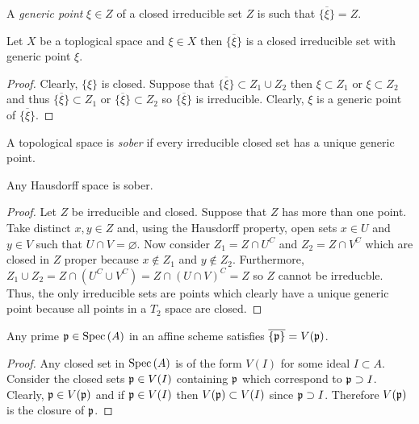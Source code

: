 \documentclass[12pt]{article}
\begin{document}
\begin{definition}
A \textit{generic point} $\xi \in Z$ of a closed irreducible set $Z$ is such that $\overline{\{ \xi \} } = Z$. 
\end{definition}

\begin{proposition}
Let $X$ be a toplogical space and $\xi \in X$ then $\overline{\{ \xi \} }$ is a closed irreducible set with generic point $\xi$. 
\end{proposition}

\begin{proof}
Clearly, $\{ \xi \}$ is closed. Suppose that $\overline{\{ \xi \}} \subset Z_1 \cup Z_2$ then $\xi \subset Z_1$ or $\xi \subset Z_2$ and thus $\overline{\{ \xi \} } \subset Z_1$ or $\overline{\{ \xi \} } \subset Z_2$ so $\overline{\{ \xi \}}$ is irreducible. Clearly, $\xi$ is a generic point of $\overline{\{ \xi \}}$. 
\end{proof}

\begin{definition}
A topological space is \textit{sober} if every irreducible closed set has a unique generic point. 
\end{definition}

\begin{proposition}
Any Hausdorff space is sober.
\end{proposition}

\begin{proof}
Let $Z$ be irreducible and closed. Suppose that $Z$ has more than one point. Take distinct $x, y \in Z$ and, using the Hausdorff property, open sets $x \in U$ and $y \in V$ such that $U \cap V = \varnothing$. Now consider $Z_1 = Z \cap U^C$ and $Z_2 = Z \cap V^C$ which are closed in $Z$ proper because $x \notin Z_1$ and $y \notin Z_2$. Furthermore, $Z_1 \cup Z_2 = Z \cap (U^C \cup V^C) = Z \cap (U \cap V)^C = Z$ so $Z$ cannot be irreducble. Thus, the only irreducible sets are points which clearly have a unique generic point because all points in a $T_2$ space are closed.
\end{proof}


\begin{lemma}
Any prime $\mathfrak{p} \in \mathrm{Spec}\left( A \right)$ in an affine scheme satisfies $\overline{\{\mathfrak{p}\}} = V(\mathfrak{p})$. 
\end{lemma}

\begin{proof}
Any closed set in $\mathrm{Spec}\left( A \right)$ is of the form $V(I)$ for some ideal $I \subset A$. Consider the closed sets $\mathfrak{p} \in V(I)$ containing $\mathfrak{p}$ which correspond to $\mathfrak{p} \supset I$. Clearly, $\mathfrak{p} \in V(\mathfrak{p})$ and if $\mathfrak{p} \in V(I)$ then $V(\mathfrak{p}) \subset V(I)$ since $\mathfrak{p} \supset I$. Therefore $V(\mathfrak{p})$ is the closure of $\mathfrak{p}$.
\end{proof}
\end{document}
